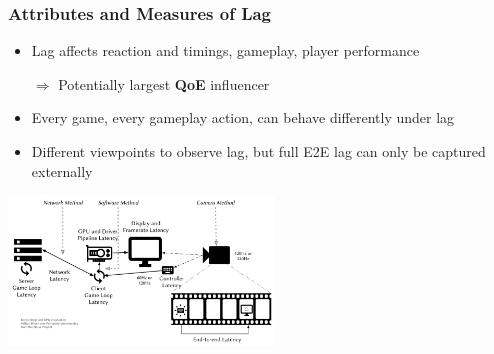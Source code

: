 \documentclass{UDEbeamerEN}
\begin{document}
\begin{frame}
	\frametitle{Attributes and Measures of Lag}

	\begin{itemize}
		\item Lag affects reaction and timings, gameplay, player performance
		\item[$\Rightarrow$] Potentially largest \textbf{QoE} influencer
		\item Every game, every gameplay action, can behave differently under lag
		\item Different viewpoints to observe lag, but full E2E lag can only be captured externally
	\end{itemize}

	\pause
	\begin{center}
		\vspace{-2mm}

		\includegraphics[height=4cm]{../../../models/e2e-lag.pdf}
	\end{center}

\end{frame}
\end{document}
